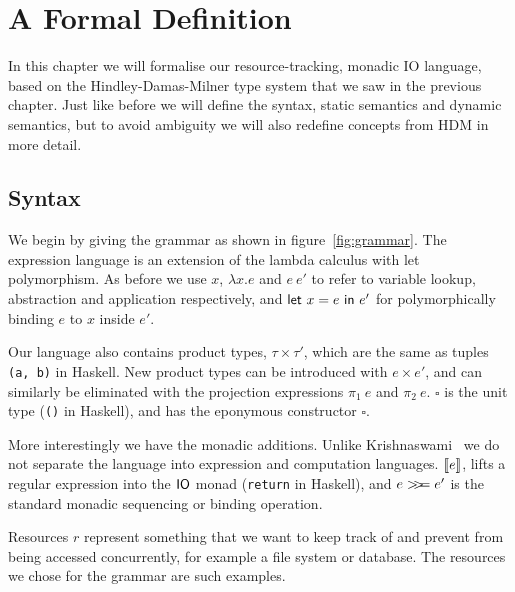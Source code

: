 \chapter{A Formal Definition}\label{chapter:system}

In this chapter we will formalise our resource-tracking, monadic IO
language, based on the Hindley-Damas-Milner type system that we saw
in the previous chapter. Just like before we will define the syntax,
static semantics and dynamic semantics, but to avoid ambiguity we will
also redefine concepts from HDM in more detail.

\section{Syntax}

\setlength{\grammarparsep}{20pt plus 1pt minus 1pt} %
\setlength{\grammarindent}{12em} %
\renewcommand{\syntleft}{}
\renewcommand{\syntright}{}


\def\defaultHypSeparation{\hskip .05in}

We begin by giving the grammar as shown in
figure~\ref{fig:grammar}. The expression language is an extension of
the lambda calculus with let polymorphism. As before we use $x$,
$\lambda x . e$ and $e \ e'$ to refer to variable lookup, abstraction and
application respectively, and $\mathsf{let} \ x = e \ \mathsf{in} \ e'$ for polymorphically
binding $e$ to $x$ inside $e'$.

Our language also contains product types, $\tau \times \tau'$, which are the same
as tuples \texttt{(a, b)} in Haskell. New product types can be
introduced with $e \times e'$, and can similarly be eliminated with the
projection expressions $\pi_1 \ e$ and $\pi_2 \ e$. $\square$ is the unit type
(\texttt{()} in Haskell), and has the eponymous
constructor $\square$.

More interestingly we have the monadic additions. Unlike
Krishnaswami~\cite{krishnaswami2006} we do not separate the language
into expression and computation languages. $[\![ e]\!]$, lifts a regular
expression into the $\mathsf{IO}$ monad (\texttt{return} in
Haskell), and $e >\!\!>\!\!= e'$ is the standard monadic sequencing or
binding operation.

Resources $r$ represent something that we want to keep track of and
prevent from being accessed concurrently, for example a file system or
database. The resources we chose for the grammar are such examples.

